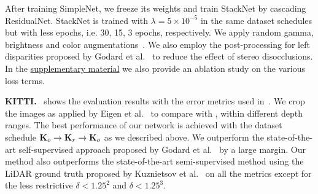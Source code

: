 \documentclass[runningheads]{llncs}
\begin{document}
After training SimpleNet, we freeze 
its weights and train StackNet by cascading 
ResidualNet. StackNet is trained with 
$\lambda = 5 \times 
10^{-5}$ in the same dataset 
schedules but with less epochs, i.e. 30, 15, 3 
epochs, respectively. We apply random gamma, brightness and color 
augmentations~\cite{godard2016unsupervised}. We 
also employ the post-processing for left disparities proposed by Godard et 
al.~\cite{godard2016unsupervised} to reduce the effect of stereo disocclusions.
In the 
\href{https://vision.in.tum.de/_media/spezial/bib/yang2018dvso-supp.pdf}{supplementary
	material} we also provide an ablation study on the various loss terms.

\textbf{KITTI.}~ 
shows the evaluation results with the error 
metrics used in~\cite{eigen2014depth}. We 
crop the images as applied by Eigen et al.~\cite{eigen2014depth} to compare 
with \cite{godard2016unsupervised}, \cite{kuznietsov2017semi} within different 
depth ranges.
The best performance of our network is achieved 
with the dataset schedule 
$\text{\textbf{K}}_o 
\rightarrow 
\text{\textbf{K}}_r \rightarrow 
\text{\textbf{K}}_o $ as we described above. 
We outperform the state-of-the-art 
self-supervised approach 
proposed by Godard et 
al.~\cite{godard2016unsupervised} by a large 
margin.
Our method also 
outperforms the state-of-the-art semi-supervised method using 
the LiDAR ground truth proposed by 
Kuznietsov et al.~\cite{kuznietsov2017semi} 
on all the metrics except for the less restrictive $\delta < 
1.25^2$ and $\delta < 1.25^3$. 
\end{document}

